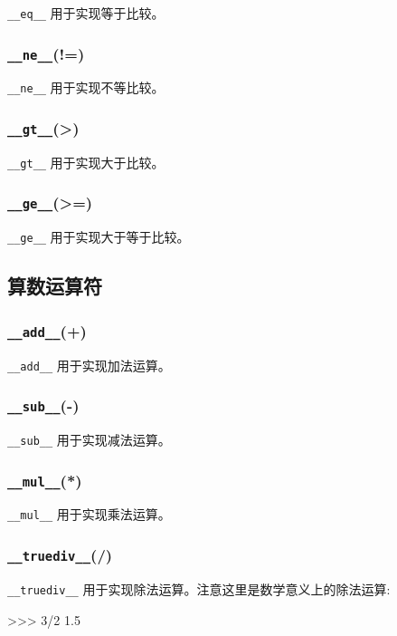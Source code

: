 \texttt{\_\_eq\_\_} 用于实现等于比较。

\subsubsection{\texttt{\_\_ne\_\_}(!=)}

\texttt{\_\_ne\_\_} 用于实现不等比较。

\subsubsection{\texttt{\_\_gt\_\_}(>)}

\texttt{\_\_gt\_\_} 用于实现大于比较。

\subsubsection{\texttt{\_\_ge\_\_}(>=)}

\texttt{\_\_ge\_\_} 用于实现大于等于比较。

\subsection{算数运算符}

\subsubsection{\texttt{\_\_add\_\_}(+)}

\texttt{\_\_add\_\_} 用于实现加法运算。

\subsubsection{\texttt{\_\_sub\_\_}(-)}

\texttt{\_\_sub\_\_} 用于实现减法运算。

\subsubsection{\texttt{\_\_mul\_\_}(*)}

\texttt{\_\_mul\_\_} 用于实现乘法运算。

\subsubsection{\texttt{\_\_truediv\_\_}(/)}

\texttt{\_\_truediv\_\_} 用于实现除法运算。注意这里是数学意义上的除法运算:
\begin{python}
>>> 3/2
1.5
\end{python}

